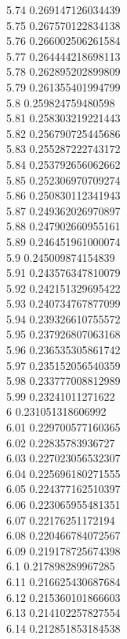 {5.74	0.269147126034439\\
5.75	0.267570122834138\\
5.76	0.266002506261584\\
5.77	0.264444218698113\\
5.78	0.262895202899809\\
5.79	0.261355401994799\\
5.8	0.259824759480598\\
5.81	0.258303219221443\\
5.82	0.256790725445686\\
5.83	0.255287222743172\\
5.84	0.253792656062662\\
5.85	0.252306970709274\\
5.86	0.250830112341943\\
5.87	0.249362026970897\\
5.88	0.247902660955161\\
5.89	0.246451961000074\\
5.9	0.245009874154839\\
5.91	0.243576347810079\\
5.92	0.242151329695422\\
5.93	0.240734767877099\\
5.94	0.239326610755572\\
5.95	0.237926807063168\\
5.96	0.236535305861742\\
5.97	0.235152056540359\\
5.98	0.233777008812989\\
5.99	0.23241011271622\\
6	0.231051318606992\\
6.01	0.229700577160365\\
6.02	0.22835783936727\\
6.03	0.227023056532307\\
6.04	0.225696180271555\\
6.05	0.224377162510397\\
6.06	0.223065955481351\\
6.07	0.22176251172194\\
6.08	0.220466784072567\\
6.09	0.219178725674398\\
6.1	0.217898289967285\\
6.11	0.216625430687684\\
6.12	0.215360101866603\\
6.13	0.214102257827554\\
6.14	0.212851853184538\\
}
